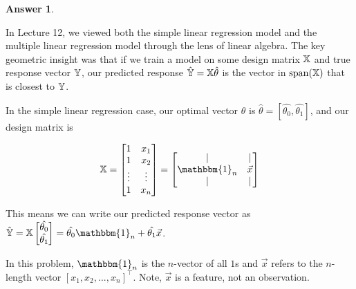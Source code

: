 \documentclass[addpoints, 12pt]{exam}
\theoremstyle{definition}
\newtheorem*{answer}{Answer}
\begin{document}
\begin{questions}
\begin{parts}
    \begin{shaded}
    \begin{answer}


    \end{answer}
    \end{shaded}

\end{parts}





\newpage



\question[8] In Lecture 12, we viewed both the simple linear regression model and the multiple linear regression model through the lens of linear algebra. The key geometric insight was that if we train a model on some design matrix $\Bbb{X}$ and true response vector $\Bbb{Y}$, our predicted response $\hat{\Bbb{Y}} = \Bbb{X} \hat{\theta}$ is the vector in $\text{span}(\Bbb{X})$ that is closest to $\Bbb{Y}$. 

In the simple linear regression case, our optimal vector $\theta$ is $\hat{\theta} = [\hat{\theta_0}, \hat{\theta_1}]$, and our design matrix is

$$\Bbb{X} = \begin{bmatrix} 1 & x_1 \\ 1 & x_2 \\ \vdots & \vdots \\ 1 & x_n \end{bmatrix} = \begin{bmatrix} | & | \\ \mathbbm{1}_n & \vec{x} \\ | & | \end{bmatrix}$$

This means we can write our predicted response vector as $\hat{\Bbb{Y}} = \Bbb{X} \begin{bmatrix} \hat{\theta_0} \\ \hat{\theta_1} \end{bmatrix} = \hat{\theta_0} \mathbbm{1}_n + \hat{\theta_1} \vec{x}$. 

In this problem, $\mathbbm{1}_n$ is the $n$-vector of all $1$s
and $\vec{x}$ refers to the $n$-length vector $[x_1, x_2, ..., x_n]^{\top}$. Note, $\vec{x}$ is a feature, not an observation.


\end{questions}
\end{document}
